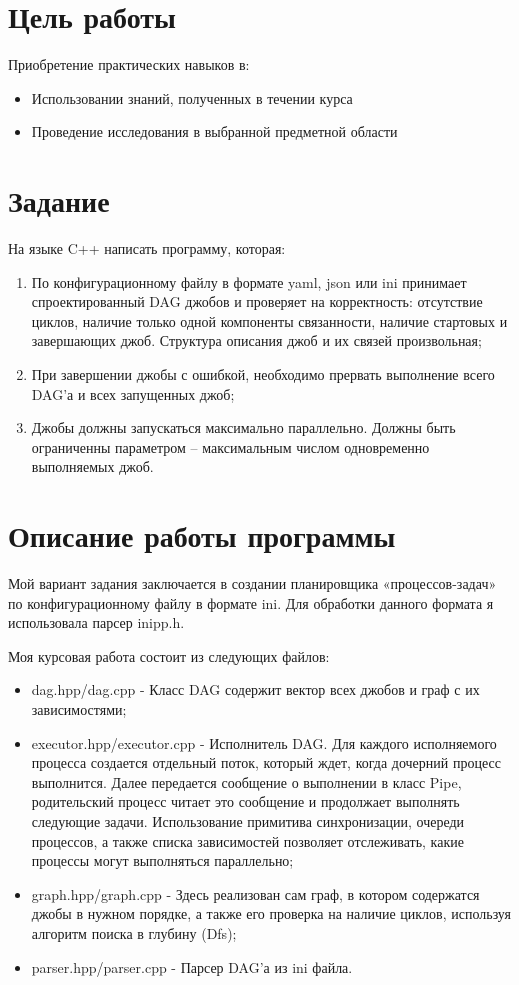 \documentclass[a4paper, 12pt]{article}
\begin{document}
\section{Цель работы}
Приобретение практических навыков в:
\begin{itemize}
  \item Использовании знаний, полученных в течении курса
  \item Проведение исследования в выбранной предметной области
\end{itemize}

\section{Задание}
На языке C++ написать программу, которая:
\begin{enumerate}
    \item По конфигурационному файлу в формате yaml, json или ini принимает спроектированный DAG джобов и проверяет на корректность: отсутствие циклов, наличие только одной компоненты связанности, наличие стартовых и завершающих джоб. Структура описания джоб и их связей произвольная;
    \item При завершении джобы с ошибкой, необходимо прервать выполнение всего DAG’а и всех запущенных джоб;
    \item Джобы должны запускаться максимально параллельно.
Должны быть ограниченны параметром – максимальным числом одновременно выполняемых джоб.
\end{enumerate}

\section{Описание работы программы}
Мой вариант задания заключается в создании планировщика «процессов-задач» по конфигурационному файлу в формате ini. Для обработки данного формата я использовала парсер inipp.h.

Моя курсовая работа состоит из следующих файлов:
\begin{itemize}
  \item dag.hpp/dag.cpp - Класс DAG содержит вектор всех джобов и граф с их зависимостями;
  \item executor.hpp/executor.cpp - Исполнитель DAG. Для каждого исполняемого процесса создается отдельный поток, который ждет, когда дочерний процесс выполнится. Далее передается сообщение о выполнении в класс Pipe, родительский процесс читает это сообщение и продолжает выполнять следующие задачи. Использование примитива синхронизации, очереди процессов, а также списка зависимостей позволяет отслеживать, какие процессы могут выполняться параллельно;
  \item graph.hpp/graph.cpp - Здесь реализован сам граф, в котором содержатся джобы в нужном порядке, а также его проверка на наличие циклов, используя алгоритм поиска в глубину (Dfs);
  \item parser.hpp/parser.cpp - Парсер DAG'а из ini файла.
\end{itemize}
\end{document}
